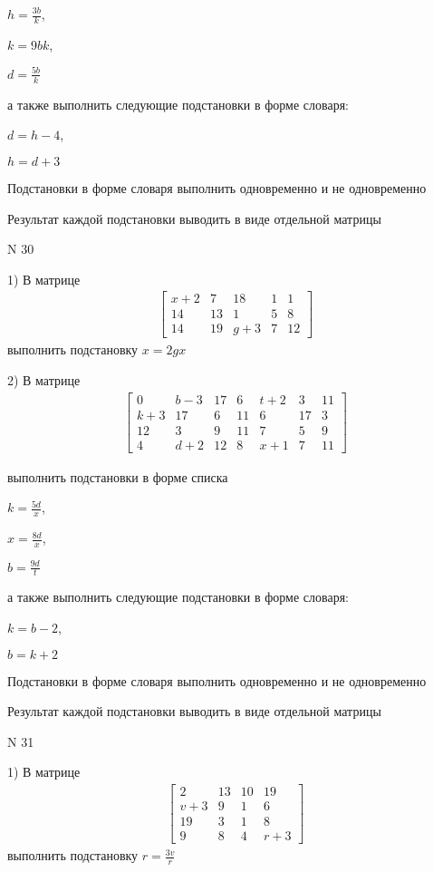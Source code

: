 \documentclass[11pt]{report}
\begin{document}
$h=\frac{3 b}{k}$,

$k=9 b k$,

$d=\frac{5 b}{k}$

а также выполнить следующие подстановки в форме словаря:

$d=h - 4$,

$h=d + 3$


    Подстановки в форме словаря выполнить одновременно и не одновременно


    Результат каждой подстановки выводить в виде отдельной матрицы

\newpage
N 30


    1) В матрице
\begin{align*}
\left[\begin{matrix}x + 2 & 7 & 18 & 1 & 1\\14 & 13 & 1 & 5 & 8\\14 & 19 & g + 3 & 7 & 12\end{matrix}\right]
\end{align*}
выполнить подстановку $x=2 g x$


    2) В матрице
\begin{align*}
\left[\begin{matrix}0 & b - 3 & 17 & 6 & t + 2 & 3 & 11\\k + 3 & 17 & 6 & 11 & 6 & 17 & 3\\12 & 3 & 9 & 11 & 7 & 5 & 9\\4 & d + 2 & 12 & 8 & x + 1 & 7 & 11\end{matrix}\right]
\end{align*}

выполнить подстановки в форме списка

$k=\frac{5 d}{x}$,

$x=\frac{8 d}{x}$,

$b=\frac{9 d}{t}$

а также выполнить следующие подстановки в форме словаря:

$k=b - 2$,

$b=k + 2$


    Подстановки в форме словаря выполнить одновременно и не одновременно


    Результат каждой подстановки выводить в виде отдельной матрицы

\newpage
N 31


    1) В матрице
\begin{align*}
\left[\begin{matrix}2 & 13 & 10 & 19\\v + 3 & 9 & 1 & 6\\19 & 3 & 1 & 8\\9 & 8 & 4 & r + 3\end{matrix}\right]
\end{align*}
выполнить подстановку $r=\frac{3 v}{r}$
\end{document}
